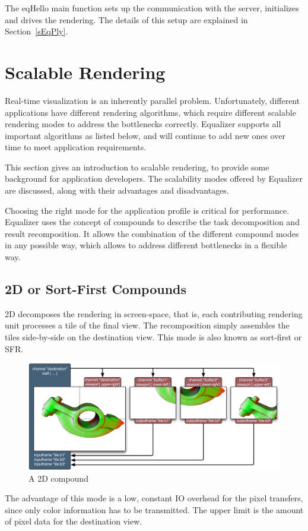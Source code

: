 \documentclass[10pt,a4]{scrartcl}
\newcommand{\sref}[1]{Section~\ref{#1}}
\begin{document}
The \textsf{eqHello} main function sets up the communication with the
server, initializes and drives the rendering. The details of this setup
are explained in \sref{sEqPly}.


\section{Scalable Rendering}

Real-time visualization is an inherently parallel
problem. Unfortunately, different applications have different rendering
algorithms, which require different scalable rendering modes to address
the bottlenecks correctly. Equalizer supports all important algorithms as
listed below, and will continue to add new ones over time to meet
application requirements.

This section gives an introduction to scalable rendering, to
provide some background for application developers. The scalability
modes offered by Equalizer are discussed, along with their advantages
and disadvantages. 

Choosing the right mode for the application profile is critical for
performance. Equalizer uses the concept of compounds to describe the
task decomposition and result recomposition. It allows the combination
of the different compound modes in any possible way, which allows to
address different bottlenecks in a flexible way.


\subsection{2D or Sort-First Compounds}

2D decomposes the rendering in screen-space, that is, each contributing
rendering unit processes a tile of the final view. The recomposition
simply assembles the tiles side-by-side on the destination view. This
mode is also known as sort-first or SFR.

\begin{figure}
  \includegraphics[width=.618\textwidth]{images/2D.pdf}
  {\caption{\small A 2D compound}}
\end{figure}
The advantage of this mode is a low, constant IO overhead for the pixel
transfers, since only color information has to be transmitted. The upper
limit is the amount of pixel data for the destination view.
\end{document}
